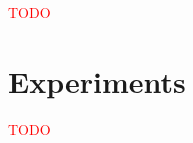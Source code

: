 \documentclass[11pt]{article}
\begin{document}
\noindent \textcolor{red}{TODO}

%
%
%
%


\section{Experiments}

\noindent \textcolor{red}{TODO}



\end{document}
